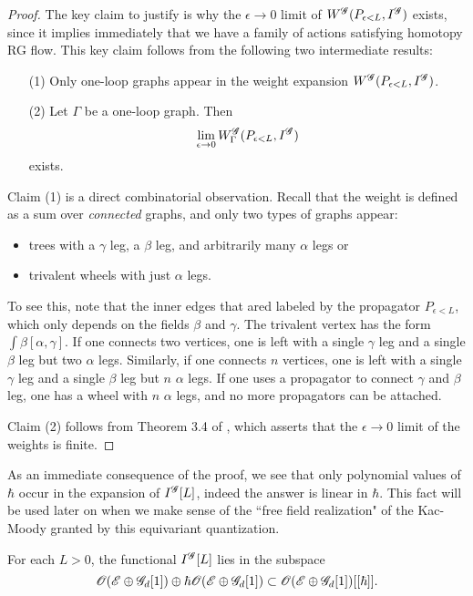 \begin{proof}
The key claim to justify is why the $\epsilon \to 0$ limit of $W^{\mathscr G} (P_{\epsilon<L} , I^{\mathscr G})$ exists,
since it implies immediately that we have a family of actions satisfying homotopy RG flow. 
This key claim follows from the following two intermediate results:
\begin{itemize}
\item[(1)] 
Only one-loop graphs appear in the weight expansion $W^{\mathscr G} (P_{\epsilon < L}, I^{\mathscr G})$. 

\item[(2)] Let $\Gamma$ be a one-loop graph.
Then
\[
\lim_{\epsilon \to 0} W^{\mathscr G}_\Gamma(P_{\epsilon < L}, I^{\mathscr G})
\]
exists.
\end{itemize}

Claim (1) is a direct combinatorial observation.
Recall that the weight is defined as a sum over {\em connected} graphs,
and only two types of graphs appear: 
\begin{itemize}
\item trees with a $\gamma$ leg, a $\beta$ leg, and arbitrarily many $\alpha$ legs or
\item trivalent wheels with just $\alpha$ legs.
\end{itemize}
To see this, note that the inner edges that ared labeled by the propagator $P_{\epsilon < L}$, which only depends on the fields $\beta$ and $\gamma$. 
The trivalent vertex has the form $\int \beta [\alpha, \gamma]$.
If one connects two vertices, one is left with a single $\gamma$ leg and a single $\beta$ leg but two $\alpha$ legs.
Similarly, if one connects $n$ vertices, one is left  with a single $\gamma$ leg and a single $\beta$ leg but $n$ $\alpha$ legs.
If one uses a propagator to connect $\gamma$ and $\beta$ leg, one has a wheel with $n$ $\alpha$ legs,
and no more propagators can be attached.

Claim (2) follows from Theorem 3.4 of \cite{BWhol}, which asserts that the $\epsilon \to 0$ limit of the weights is finite. 
\end{proof}

As an immediate consequence of the proof, we see that only polynomial values of $\hbar$ occur in the expansion of $I^{\mathscr G}[L]$, indeed the answer is linear in $\hbar$. 
This fact will be used later on when we make sense of the ``free field realization" of the Kac-Moody granted by this equivariant quantization. 

\begin{cor}
For each $L > 0$, the functional $I^{\mathscr G}[L]$ lies in the subspace 
\[
\mathscr O(\mathscr E \oplus \mathscr G_d[1]) \oplus \hbar \mathscr O(\mathscr E \oplus \mathscr G_d[1]) \subset \mathscr O(\mathscr E \oplus \mathscr G_d[1]) [[\hbar]].
\] 
\end{cor}

